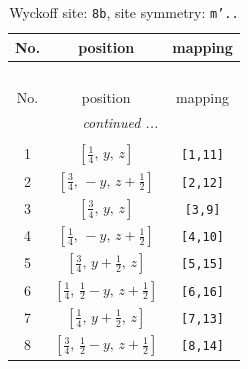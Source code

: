 \documentclass[fleqn,8pt]{jsarticle}
\begin{document}
\begin{longtable}{ccc}
\caption{Wyckoff site: {\tt 8b}, site symmetry: {\tt m'..}}
 \\
 \hline \hline
No. & position & mapping \\ \hline \endfirsthead

\multicolumn{2}{l}{\tablename\ \thetable{}} \\
 \hline \hline
No. & position & mapping \\ \hline \endhead

 \hline \hline
\multicolumn{2}{r}{\footnotesize\it continued ...} \\ \endfoot

 \hline \hline
\multicolumn{2}{r}{} \\ \endlastfoot

1 & $\left[ \frac{1}{4},\, y,\, z \right]$ & {\tt [1,11]} \\ \hline
2 & $\left[ \frac{3}{4},\, - y,\, z + \frac{1}{2} \right]$ & {\tt [2,12]} \\ \hline
3 & $\left[ \frac{3}{4},\, y,\, z \right]$ & {\tt [3,9]} \\ \hline
4 & $\left[ \frac{1}{4},\, - y,\, z + \frac{1}{2} \right]$ & {\tt [4,10]} \\ \hline
5 & $\left[ \frac{3}{4},\, y + \frac{1}{2},\, z \right]$ & {\tt [5,15]} \\ \hline
6 & $\left[ \frac{1}{4},\, \frac{1}{2} - y,\, z + \frac{1}{2} \right]$ & {\tt [6,16]} \\ \hline
7 & $\left[ \frac{1}{4},\, y + \frac{1}{2},\, z \right]$ & {\tt [7,13]} \\ \hline
8 & $\left[ \frac{3}{4},\, \frac{1}{2} - y,\, z + \frac{1}{2} \right]$ & {\tt [8,14]} \\
\end{longtable}
\renewcommand{\arraystretch}{1.2}
\end{document}
